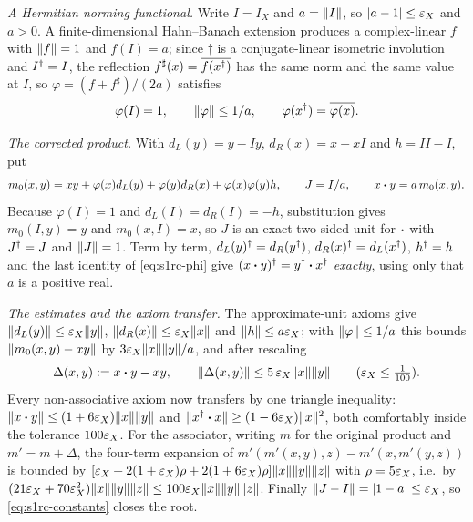 \emph{A Hermitian norming functional.} Write $I=I_X$ and $a=\lVert I\rVert$, so $\lvert a-1\rvert\le\varepsilon_X$
and $a>0$. A finite-dimensional Hahn--Banach extension produces a complex-linear $f$ with
$\lVert f\rVert=1$ and $f(I)=a$; since $\dagger$ is a conjugate-linear isometric involution and
$I^{\dagger}=I$, the reflection $f^{\sharp}(x)=\overline{f(x^{\dagger})}$ has the same norm and the same
value at $I$, so $\varphi=(f+f^{\sharp})/(2a)$ satisfies
\begin{equation}\label{eq:s1rc-phi}
  \varphi(I)=1,\qquad \lVert \varphi\rVert\le 1/a,\qquad \varphi(x^{\dagger})=\overline{\varphi(x)} .
\end{equation}

\emph{The corrected product.} With $d_L(y)=y-Iy$, $d_R(x)=x-xI$ and $h=II-I$, put
\begin{equation}\label{eq:s1rc-product}
  m_0(x,y)=xy+\varphi(x)d_L(y)+\varphi(y)d_R(x)+\varphi(x)\varphi(y)h,
  \qquad J=I/a,\qquad x\mathbin{\bm{\cdot}} y=a\,m_0(x,y).
\end{equation}
Because $\varphi(I)=1$ and $d_L(I)=d_R(I)=-h$, substitution gives $m_0(I,y)=y$ and
$m_0(x,I)=x$, so $J$ is an exact two-sided unit for $\mathbin{\bm{\cdot}}$ with $J^{\dagger}=J$ and $\lVert J\rVert=1$.
Term by term, $d_L(y)^{\dagger}=d_R(y^{\dagger})$, $d_R(x)^{\dagger}=d_L(x^{\dagger})$, $h^{\dagger}=h$ and the last identity
of \eqref{eq:s1rc-phi} give $(x\mathbin{\bm{\cdot}} y)^{\dagger}=y^{\dagger}\mathbin{\bm{\cdot}} x^{\dagger}$ \emph{exactly}, using only that
$a$ is a positive real.

\emph{The estimates and the axiom transfer.} The approximate-unit axioms give
$\lVert d_L(y)\rVert\le\varepsilon_X\lVert y\rVert$, $\lVert d_R(x)\rVert\le\varepsilon_X\lVert x\rVert$ and $\lVert h\rVert\le a\varepsilon_X$;
with $\lVert \varphi\rVert\le1/a$ this bounds $\lVert m_0(x,y)-xy\rVert$ by $3\varepsilon_X\lVert x\rVert\lVert y\rVert/a$, and
after rescaling
\begin{equation}\label{eq:s1rc-delta}
  \Delta(x,y):=x\mathbin{\bm{\cdot}} y-xy,\qquad
  \lVert \Delta(x,y)\rVert\le 5\,\varepsilon_X\lVert x\rVert\lVert y\rVert\qquad(\varepsilon_X\le\tfrac1{100}).
\end{equation}
Every non-associative axiom now transfers by one triangle inequality:
$\lVert x\mathbin{\bm{\cdot}} y\rVert\le(1+6\varepsilon_X)\lVert x\rVert\lVert y\rVert$ and
$\lVert x^{\dagger}\mathbin{\bm{\cdot}} x\rVert\ge(1-6\varepsilon_X)\lVert x\rVert^2$, both comfortably inside the tolerance
$100\varepsilon_X$. For the associator, writing $m$ for the original product and $m'=m+\Delta$,
the four-term expansion of $m'(m'(x,y),z)-m'(x,m'(y,z))$ is bounded by
$[\varepsilon_X+2(1+\varepsilon_X)\rho+2(1+6\varepsilon_X)\rho]\lVert x\rVert\lVert y\rVert\lVert z\rVert$ with $\rho=5\varepsilon_X$, i.e.\ by
$(21\varepsilon_X+70\varepsilon_X^{2})\lVert x\rVert\lVert y\rVert\lVert z\rVert\le100\varepsilon_X\lVert x\rVert\lVert y\rVert\lVert z\rVert$. Finally
$\lVert J-I\rVert=\lvert1-a\rvert\le\varepsilon_X$, so \eqref{eq:s1rc-constants} closes the root.


